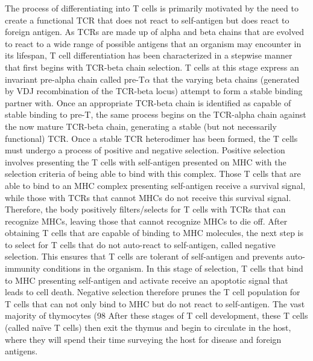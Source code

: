 The process of differentiating into T cells is primarily motivated by the need to create a functional TCR that does not react to self-antigen but does react to foreign antigen. As TCRs are made up of alpha and beta chains that are evolved to react to a wide range of possible antigens that an organism may encounter in its lifespan, T cell differentiation has been characterized in a stepwise manner that first begins with TCR-beta chain selection. T cells at this stage express an invariant pre-alpha chain called pre-T$\alpha$ that the varying beta chains (generated by VDJ recombination of the TCR-beta locus) attempt to form a stable binding partner with. Once an appropriate TCR-beta chain is identified as capable of stable binding to pre-T, the same process begins on the TCR-alpha chain against the now mature TCR-beta chain, generating a stable (but not necessarily functional) TCR.
Once a stable TCR heterodimer has been formed, the T cells must undergo a process of positive and negative selection. Positive selection involves presenting the T cells with self-antigen presented on MHC with the selection criteria of being able to bind with this complex. Those T cells that are able to bind to an MHC complex presenting self-antigen receive a survival signal, while those with TCRs that cannot MHCs do not receive this survival signal. Therefore, the body positively filters/selects for T cells with TCRs that can recognize MHCs, leaving those that cannot recognize MHCs to die off. 
After obtaining T cells that are capable of binding to MHC molecules, the next step is to select for T cells that do not auto-react to self-antigen, called negative selection. This ensures that T cells are tolerant of self-antigen and prevents auto-immunity conditions in the organism. In this stage of selection, T cells that bind to MHC presenting self-antigen and activate receive an apoptotic signal that leads to cell death. Negative selection therefore prunes the T cell population for T cells that can not only bind to MHC but do not react to self-antigen. The vast majority of thymocytes (98%
After these stages of T cell development, these T cells (called naïve T cells) then exit the thymus and begin to circulate in the host, where they will spend their time surveying the host for disease and foreign antigens.

